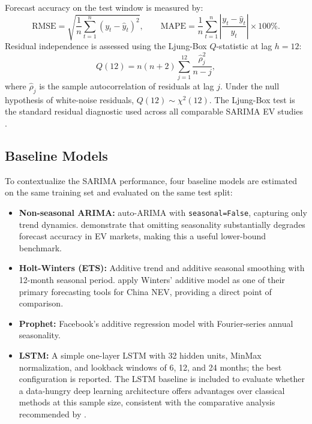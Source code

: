 \documentclass[12pt]{article}
\begin{document}
Forecast accuracy on the test window is measured by:
\begin{equation}
\text{RMSE} = \sqrt{\frac{1}{n}\sum_{t=1}^{n}(y_t - \hat{y}_t)^2},
\qquad
\text{MAPE} = \frac{1}{n}\sum_{t=1}^{n}\left|\frac{y_t - \hat{y}_t}{y_t}\right|
\times 100\%.
\end{equation}
Residual independence is assessed using the Ljung-Box $Q$-statistic at lag $h = 12$:
\begin{equation}
Q(12) = n(n+2)\sum_{j=1}^{12}\frac{\hat{\rho}_j^2}{n-j},
\end{equation}
where $\hat{\rho}_j$ is the sample autocorrelation of residuals at lag $j$. Under the null hypothesis of white-noise residuals, $Q(12) \sim \chi^2(12)$. The Ljung-Box test is the standard residual diagnostic used across all comparable SARIMA EV studies \citep{liang2025, cetin2024, lu2024}.

\subsection{Baseline Models}

To contextualize the SARIMA performance, four baseline models are estimated on the same training set and evaluated on the same test split:

\begin{itemize}
\item \textbf{Non-seasonal ARIMA:} auto-ARIMA with \texttt{seasonal=False}, capturing only trend dynamics. \citet{lu2024} demonstrate that omitting seasonality substantially degrades forecast accuracy in EV markets, making this a useful lower-bound benchmark.
\item \textbf{Holt-Winters (ETS):} Additive trend and additive seasonal smoothing with 12-month seasonal period. \citet{ge2024} apply Winters' additive model as one of their primary forecasting tools for China NEV, providing a direct point of comparison.
\item \textbf{Prophet:} Facebook's additive regression model with Fourier-series annual seasonality.
\item \textbf{LSTM:} A simple one-layer LSTM with 32 hidden units, MinMax normalization, and lookback windows of 6, 12, and 24 months; the best configuration is reported. The LSTM baseline is included to evaluate whether a data-hungry deep learning architecture offers advantages over classical methods at this sample size, consistent with the comparative analysis recommended by \citet{cetin2024}.
\end{itemize}
\end{document}
